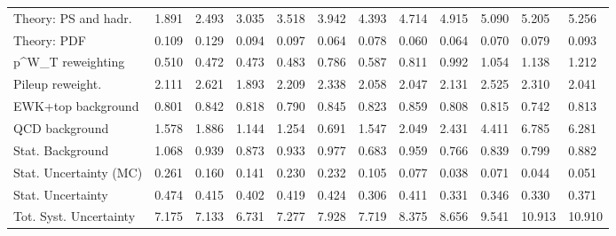 \begin{tabular}{l|p{0.6cm}p{0.6cm}p{0.6cm}p{0.6cm}p{0.6cm}p{0.6cm}p{0.6cm}p{0.6cm}p{0.6cm}p{0.6cm}p{0.6cm}}
Theory: PS and hadr.                     & 1.891 & 2.493 & 3.035 & 3.518 & 3.942 & 4.393 & 4.714 & 4.915 & 5.090 & 5.205 & 5.256 \\
Theory: PDF                              & 0.109 & 0.129 & 0.094 & 0.097 & 0.064 & 0.078 & 0.060 & 0.064 & 0.070 & 0.079 & 0.093 \\
p^{W}_{T} reweighting                    & 0.510 & 0.472 & 0.473 & 0.483 & 0.786 & 0.587 & 0.811 & 0.992 & 1.054 & 1.138 & 1.212 \\
Pileup reweight.                         & 2.111 & 2.621 & 1.893 & 2.209 & 2.338 & 2.058 & 2.047 & 2.131 & 2.525 & 2.310 & 2.041 \\
EWK+top background                       & 0.801 & 0.842 & 0.818 & 0.790 & 0.845 & 0.823 & 0.859 & 0.808 & 0.815 & 0.742 & 0.813 \\
QCD background                           & 1.578 & 1.886 & 1.144 & 1.254 & 0.691 & 1.547 & 2.049 & 2.431 & 4.411 & 6.785 & 6.281 \\
Stat. Background                         & 1.068 & 0.939 & 0.873 & 0.933 & 0.977 & 0.683 & 0.959 & 0.766 & 0.839 & 0.799 & 0.882 \\
Stat. Uncertainty (MC)                   & 0.261 & 0.160 & 0.141 & 0.230 & 0.232 & 0.105 & 0.077 & 0.038 & 0.071 & 0.044 & 0.051 \\
\hline
Stat. Uncertainty                        & 0.474 & 0.415 & 0.402 & 0.419 & 0.424 & 0.306 & 0.411 & 0.331 & 0.346 & 0.330 & 0.371 \\
\hline
Tot. Syst. Uncertainty                   & 7.175 & 7.133 & 6.731 & 7.277 & 7.928 & 7.719 & 8.375 & 8.656 & 9.541 & 10.913 & 10.910 \\
\hline
\end{tabular}
